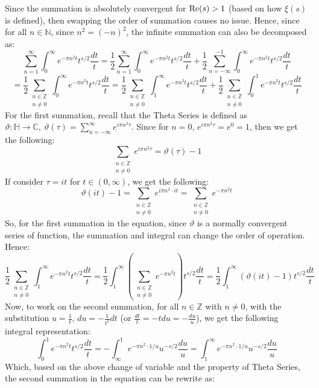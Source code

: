 \documentclass{article}
\begin{document}
Since the summation is absolutely convergent for $\textmd{Re}(s)>1$ (based on how $\xi(s)$ is defined), then swapping the order of summation causes no issue. Hence, since for all $n\in\mathbb{N}$, since $n^2=(-n)^2$, the infinite summation can also be decomposed as:
$$\sum_{n=1}^{\infty}\int_{0}^{\infty}e^{-\pi n^2t}t^{s/2}\frac{dt}{t} = \frac{1}{2}\sum_{n=1}^{\infty}\int_{0}^{\infty}e^{-\pi n^2t}t^{s/2}\frac{dt}{t}+\frac{1}{2}\sum_{n=-\infty}^{-1}\int_{0}^{\infty}e^{-\pi n^2t}t^{s/2}\frac{dt}{t}$$
$$= \frac{1}{2}\sum_{\substack{n\in\mathbb{Z}\\n\neq 0}}\int_{0}^{\infty}e^{-\pi n^2t}t^{s/2}\frac{dt}{t} =\frac{1}{2}\sum_{\substack{n\in\mathbb{Z}\\n\neq 0}}\int_{1}^{\infty}e^{-\pi n^2t}t^{s/2}\frac{dt}{t}+\frac{1}{2}\sum_{\substack{n\in\mathbb{Z}\\n\neq 0}}\int_{0}^{1}e^{-\pi n^2t}t^{s/2}\frac{dt}{t}$$
For the first summation, recall that the Theta Series is defined as $\vartheta:\mathbb{H}\rightarrow\mathbb{C},\ \vartheta(\tau) = \sum_{n=-\infty}^{\infty}e^{i\pi n^2\tau}$.
Since for $n=0$, $e^{i\pi n^2\tau} = e^0=1$, then we get the following:
$$\sum_{\substack{n\in\mathbb{Z}\\n\neq 0}}e^{i\pi n^2\tau} = \vartheta(\tau)-1$$
If consider $\tau=it$ for $t\in(0,\infty)$, we get the following:
$$\vartheta(it)-1 = \sum_{\substack{n\in\mathbb{Z}\\n\neq 0}}e^{i\pi n^2\cdot it} = \sum_{\substack{n\in\mathbb{Z}\\n\neq 0}}e^{-\pi n^2t}$$
So, for the first summation in the equation, since $\vartheta$ is a normally convergent series of function, the summation and integral can change the order of operation. Hence:
$$\frac{1}{2}\sum_{\substack{n\in\mathbb{Z}\\n\neq 0}}\int_{1}^{\infty}e^{-\pi n^2t}t^{s/2}\frac{dt}{t} = \frac{1}{2}\int_{1}^{\infty}\left(\sum_{\substack{n\in\mathbb{Z}\\n\neq 0}}e^{-\pi n^2t}\right)t^{s/2}\frac{dt}{t} = \frac{1}{2}\int_{1}^{\infty}(\vartheta(it)-1)t^{s/2}\frac{dt}{t}$$
Now, to work on the second summation, for all $n\in\mathbb{Z}$ with $n\neq 0$, with the substitution $u=\frac{1}{t}$, $du=-\frac{1}{t^2}dt$ (or $\frac{dt}{t}=-tdu = -\frac{du}{u}$), we get the following integral representation:
$$\int_{0}^{1}e^{-\pi n^2t}t^{s/2}\frac{dt}{t} = -\int_{\infty}^{1}e^{-\pi n^2\cdot 1/u}u^{-s/2}\frac{du}{u} = \int_{1}^{\infty}e^{-\pi n^2\cdot 1/u}u^{-s/2}\frac{du}{u}$$
Which, based on the above change of variable and the property of Theta Series, the second summation in the equation can be rewrite as:
\end{document}
